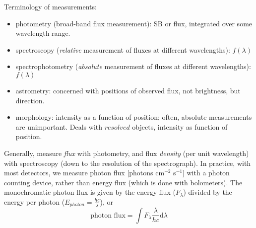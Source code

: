 \documentclass[12pt]{article}
\begin{document}
\noindent Terminology of measurements:
\begin{itemize}
    \item photometry (broad-band flux measurement): SB or flux, integrated
        over some wavelength range.
    \item spectroscopy (\emph{relative} measurement of fluxes at
        different wavelengths):
        $f(\lambda)$
    \item spectrophotometry (\emph{absolute} measurement of fluxes at
        different wavelengths):
        $f(\lambda)$
    \item astrometry: concerned with positions of observed flux, not brightness,
        but direction.
    \item morphology: intensity as a function of position;
        often, absolute measurements are unimportant. Deals with $resolved$
        objects, intensity as function of position.
\end{itemize}
Generally, measure \emph{flux} with photometry, and flux
\emph{density} (per unit wavelength)  with spectroscopy
(down to the resolution of the spectrograph). In practice, with most detectors,
we measure photon flux [photons cm$^{-2}$ s$^{-1}$] with a photon counting device,
rather than energy flux (which is done with bolometers).
The monochromatic photon flux is given by the energy flux ($F_{\lambda}$)
divided by the energy per photon ($E_{photon} = \frac{hc}{\lambda}$),
or
\begin{equation*}
    \textrm{photon\ flux} = \int F_{\lambda} \frac{\lambda}{hc} \textrm{d} \lambda
\end{equation*}


\end{document}
